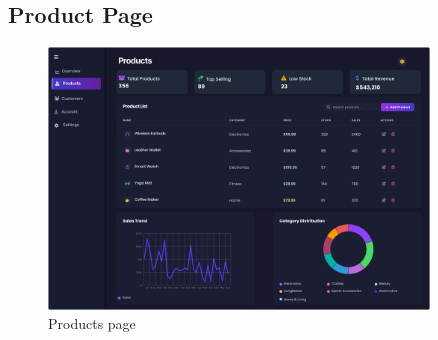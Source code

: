 \documentclass[12pt]{article}
\begin{document}
	\newpage
	\subsection{Product Page}\label{subsec:product-page}

	\begin{figure}[h]
		\centering
		\includegraphics[width=0.9\textwidth]{pictures/admin/Products_Admin}
		\caption{Products page}\label{fig:figure2}
	\end{figure}
\end{document}
